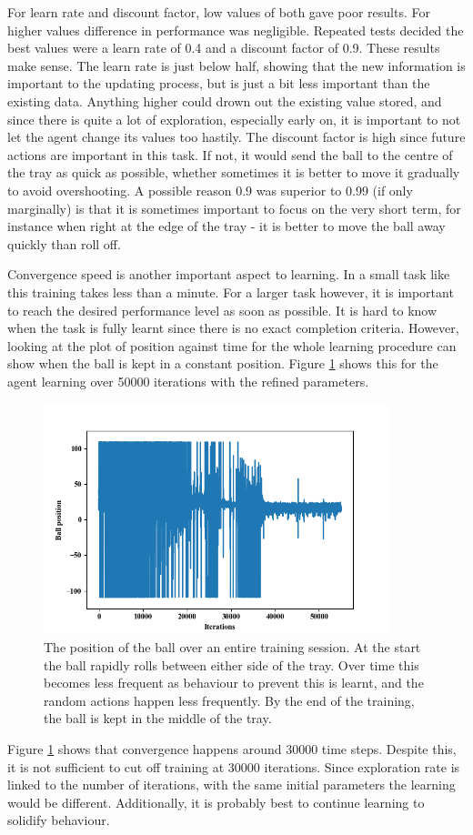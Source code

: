 \documentclass[12pt,a4paper]{article}
\begin{document}
For learn rate and discount factor, low values of both gave poor results. For higher values difference in performance was negligible. Repeated tests decided the best values were a learn rate of 0.4 and a discount factor of 0.9. These results make sense. The learn rate is just below half, showing that the new information is important to the updating process, but is just a bit less important than the existing data. Anything higher could drown out the existing value stored, and since there is quite a lot of exploration, especially early on, it is important to not let the agent change its values too hastily. The discount factor is high since future actions are important in this task. If not, it would send the ball to the centre of the tray as quick as possible, whether sometimes it is better to move it gradually to avoid overshooting. A possible reason 0.9 was superior to 0.99 (if only marginally) is that it is sometimes important to focus on the very short term, for instance when right at the edge of the tray - it is better to move the ball away quickly than roll off.

Convergence speed is another important aspect to learning. In a small task like this training takes less than a minute. For a larger task however, it is important to reach the desired performance level as soon as possible. It is hard to know when the task is fully learnt since there is no exact completion criteria. However, looking at the plot of position against time for the whole learning procedure can show when the ball is kept in a constant position. Figure \ref{f3} shows this for the agent learning over 50000 iterations with the refined parameters.
\begin{figure}[H]
	\centering
	\includegraphics[width=10cm]{153_small}
	\caption{The position of the ball over an entire training session. At the start the ball rapidly rolls between either side of the tray. Over time this becomes less frequent as behaviour to prevent this is learnt, and the random actions happen less frequently. By the end of the training, the ball is kept in the middle of the tray.}
	\label{f3}
\end{figure}
Figure \ref{f3} shows that convergence happens around 30000 time steps. Despite this, it is not sufficient to cut off training at 30000 iterations. Since exploration rate is linked to the number of iterations, with the same initial parameters the learning would be different. Additionally, it is probably best to continue learning to solidify behaviour. 
\end{document}
